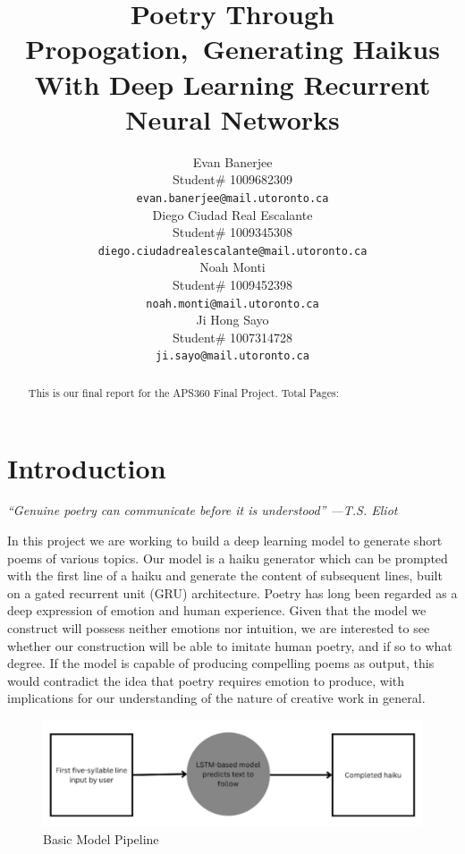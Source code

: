 \documentclass{article} %
\title{Poetry Through Propogation,\ Generating Haikus With Deep Learning Recurrent Neural Networks}
\author{Evan Banerjee  \\
Student\# 1009682309\\
\texttt{evan.banerjee@mail.utoronto.ca} \\
\And
Diego Ciudad Real Escalante  \\
Student\# 1009345308 \\
\texttt{diego.ciudadrealescalante@mail.utoronto.ca} \\
\AND
Noah Monti  \\
Student\# 1009452398 \\
\texttt{noah.monti@mail.utoronto.ca} \\
\And
Ji Hong Sayo \\
Student\# 1007314728 \\
\texttt{ji.sayo@mail.utoronto.ca} \\
\AND
}
\begin{document}
\maketitle

\begin{abstract}
  This is our final report for the APS360 Final Project.
  Total Pages: \pageref{last_page}
\end{abstract}

\section{Introduction}

\begin{center}
  \textit{“Genuine poetry can communicate before it is understood” —T.S. Eliot}
\end{center}

In this project we are working to build a deep learning model to generate short poems of various topics.
Our model is a haiku generator which can be prompted with the first line of a haiku and generate the content of subsequent lines, built on a gated recurrent unit (GRU) architecture.
Poetry has long been regarded as a deep expression of emotion and human experience. Given that the model we construct will possess neither emotions nor intuition, we are interested to see whether our construction will be able to imitate human poetry, and if so to what degree. If the model is capable of producing compelling poems as output, this would contradict the idea that poetry requires emotion to produce, with implications for our understanding of the nature of creative work in general.

\begin{figure}[h]
  \begin{center}
  \includegraphics[width=1\textwidth]{Figs/pipeline.png}
  \end{center}
  \caption{Basic Model Pipeline}
  \label{fig:Basic Model Pipeline}
\end{figure}
\end{document}

